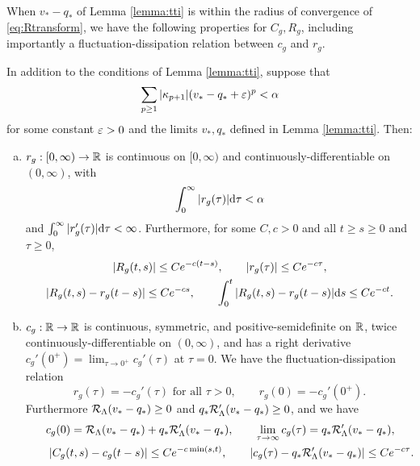 When $v_*-q_*$ of Lemma \ref{lemma:tti}
is within the radius of convergence of \eqref{eq:Rtransform},
we have the following properties for $C_g,R_g$, including
importantly a fluctuation-dissipation relation between $c_g$ and $r_g$.

\begin{lemma}\label{lemma:ttig}
In addition to the conditions of Lemma \ref{lemma:tti}, suppose that
\begin{equation}\label{eq:Rdomain}
\sum_{p \geq 1} |\kappa_{p+1}|(v_*-q_*+\varepsilon)^p<\alpha
\end{equation}
for some constant $\varepsilon>0$ and the limits $v_*,q_*$ defined in Lemma
\ref{lemma:tti}. Then:
\begin{enumerate}[(a)]
\item $r_g:[0,\infty) \to \mathbb{R}$ is continuous on $[0,\infty)$ and
continuously-differentiable on $(0,\infty)$, with
\begin{equation}\label{eq:intrgbound}
\int_0^\infty |r_g(\tau)| \mathrm{d} \tau<\alpha
\end{equation}
and $\int_0^\infty |r_g'(\tau)|\mathrm{d}\tau<\infty$.
Furthermore, for some $C,c>0$ and all $t \geq s \geq 0$ and $\tau \geq 0$,
\begin{equation}\label{eq:rgbounds}
\begin{gathered}
|R_g(t,s)| \leq Ce^{-c(t-s)}, \qquad |r_g(\tau)| \leq Ce^{-c\tau},\\
|R_g(t,s)-r_g(t-s)| \leq Ce^{-cs}, \qquad
\int_0^t |R_g(t,s)-r_g(t-s)| \mathrm{d} s \leq Ce^{-ct}.
\end{gathered}
\end{equation}
\item $c_g:\mathbb{R} \to \mathbb{R}$ is continuous, symmetric, and positive-semidefinite on
$\mathbb{R}$, twice continuously-differentiable on $(0,\infty)$, and has
a right derivative $c_g'(0^+)=\lim_{\tau \to 0^+} c_g'(\tau)$ at $\tau=0$.
We have the fluctuation-dissipation relation
\begin{equation}\label{eq:cgrgFDT}
r_g(\tau)={-}c_g'(\tau) \text{ for all } \tau>0,
\qquad r_g(0)={-}c_g'(0^+).
\end{equation}
Furthermore $\mathcal{R}_\Lambda(v_*-q_*) \geq 0$ and
$q_*\mathcal{R}_\Lambda'(v_*-q_*) \geq 0$, and we have
\begin{equation}\label{eq:cgbounds}
\begin{gathered}
c_g(0)=\mathcal{R}_\Lambda(v_*-q_*)+q_*\mathcal{R}_\Lambda'(v_*-q_*),
\qquad
\lim_{\tau \to \infty} c_g(\tau)=q_*\mathcal{R}_\Lambda'(v_*-q_*),\\
\qquad |C_g(t,s)-c_g(t-s)| \leq Ce^{-c\min(s,t)},
\qquad |c_g(\tau)-q_*\mathcal{R}_\Lambda'(v_*-q_*)| \leq Ce^{-c\tau}.
\end{gathered}
\end{equation}
\end{enumerate}
\end{lemma}

